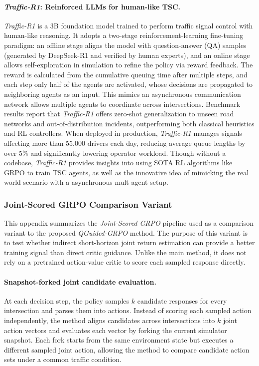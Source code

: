\paragraph{\textit{Traffic-R1}: Reinforced LLMs for human-like TSC.}
\textit{Traffic-R1}\cite{zou2025trafficr1reinforcedllmsbring} is a 3B foundation model trained to perform traffic signal control with human-like reasoning. It adopts a two-stage reinforcement-learning fine-tuning paradigm: an offline stage aligns the model with question-answer (QA) samples (generated by DeepSeek-R1 and verified by human experts), and an online stage allows self-exploration in simulation to refine the policy via reward feedback. The reward is calculated from the cumulative queuing time after multiple steps, and each step only half of the agents are activated, whose decisions are propagated to neighboring agents as an input. This mimics an asynchronous communication network allows multiple agents to coordinate across intersections. Benchmark results report that \textit{Traffic-R1} offers zero-shot generalization to unseen road networks and out-of-distribution incidents, outperforming both classical heuristics and RL controllers. When deployed in production, \textit{Traffic-R1} manages signals affecting more than 55,000 drivers each day, reducing average queue lengths by over 5\% and significantly lowering operator workload. Though without a codebase, \textit{Traffic-R1} provides insights into using SOTA RL algorithms like GRPO to train TSC agents, as well as the innovative idea of mimicking the real world scenario with a asynchronous mult-agent setup.

\subsubsection{Joint-Scored GRPO Comparison Variant}
\label{appendix:joint_scored_grpo}
This appendix summarizes the \textit{Joint-Scored GRPO} pipeline used as a comparison variant to the proposed \textit{QGuided-GRPO} method. The purpose of this variant is to test whether indirect short-horizon joint return estimation can provide a better training signal than direct critic guidance. Unlike the main method, it does not rely on a pretrained action-value critic to score each sampled response directly.

\paragraph{Snapshot-forked joint candidate evaluation.}
At each decision step, the policy samples $k$ candidate responses for every intersection and parses them into actions. Instead of scoring each sampled action independently, the method aligns candidates across intersections into $k$ joint action vectors and evaluates each vector by forking the current simulator snapshot. Each fork starts from the same environment state but executes a different sampled joint action, allowing the method to compare candidate action sets under a common traffic condition.

